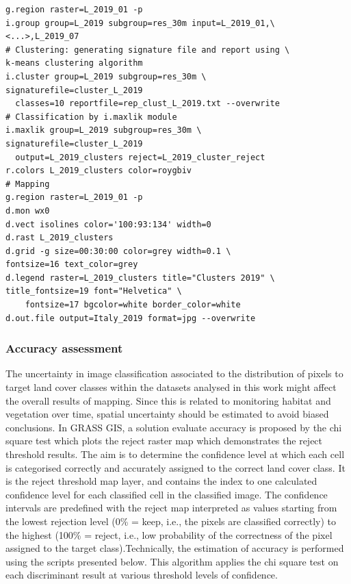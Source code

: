 \documentclass[eprint,
approc,		%
]{actapoly}
\begin{document}
\begin{footnotesize}
\begin{verbatim}
g.region raster=L_2019_01 -p
i.group group=L_2019 subgroup=res_30m input=L_2019_01,\
<...>,L_2019_07
# Clustering: generating signature file and report using \
k-means clustering algorithm
i.cluster group=L_2019 subgroup=res_30m \
signaturefile=cluster_L_2019 
  classes=10 reportfile=rep_clust_L_2019.txt --overwrite
# Classification by i.maxlik module
i.maxlik group=L_2019 subgroup=res_30m \
signaturefile=cluster_L_2019
  output=L_2019_clusters reject=L_2019_cluster_reject
r.colors L_2019_clusters color=roygbiv
# Mapping
g.region raster=L_2019_01 -p
d.mon wx0
d.vect isolines color='100:93:134' width=0
d.rast L_2019_clusters
d.grid -g size=00:30:00 color=grey width=0.1 \
fontsize=16 text_color=grey
d.legend raster=L_2019_clusters title="Clusters 2019" \
title_fontsize=19 font="Helvetica" \
	fontsize=17 bgcolor=white border_color=white
d.out.file output=Italy_2019 format=jpg --overwrite
\end{verbatim}
\end{footnotesize}

\subsubsection{Accuracy assessment}

The uncertainty in image classification associated to the distribution of pixels to target land cover classes within the datasets analysed in this work might affect the overall results of mapping. Since this is related to monitoring habitat and vegetation over time, spatial uncertainty should be estimated to avoid biased conclusions. In GRASS GIS, a solution evaluate accuracy is proposed by the chi square test which plots the reject raster map which demonstrates the reject threshold results. The aim is to determine the confidence level at which each cell is categorised correctly and accurately assigned to the correct land cover class. It is the reject threshold map layer, and contains the index to one calculated confidence level for each classified cell in the classified image. The confidence intervals are predefined with the reject map interpreted as values starting from the lowest rejection level (0\% = keep, i.e., the pixels are classified correctly) to the highest (100\% = reject, i.e., low probability of the correctness of the pixel assigned to the target class).Technically, the estimation of accuracy is performed using the scripts presented below. This algorithm applies the chi square test on each discriminant result at various threshold levels of confidence. 
\end{document}
